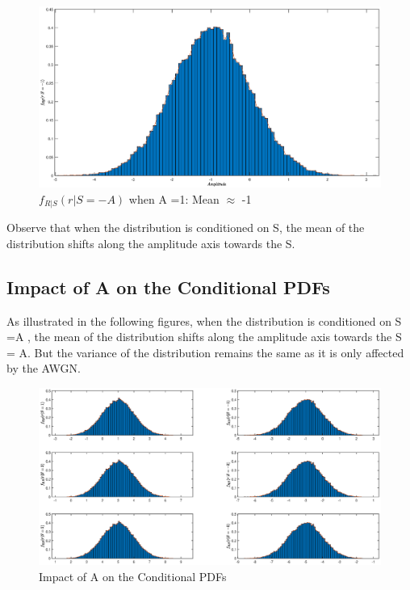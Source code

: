 \documentclass[a4paper,11pt]{article}%
\begin{document}
\begin{figure}[!h]
	\centering
	\includegraphics[scale=0.45]{figures/q5f7}
	\caption{$f_{R|S}(r|S= -A)$ when A =1: Mean $\approx$ -1}
\end{figure}

Observe that when the distribution is conditioned on S, the mean of the distribution shifts along the amplitude axis towards the S.

\pagebreak
\subsection{Impact of A on the Conditional PDFs}

As illustrated in the following figures, when the distribution is conditioned on S =A , the mean of the distribution shifts along the amplitude axis towards the S = A.  But the variance of the distribution remains the same as it is only affected by the AWGN.

\begin{figure}[!h]
	\centering
	\includegraphics[scale=0.45]{figures/q5f8}
	\caption{Impact of A on the Conditional PDFs}
\end{figure}
\end{document}
